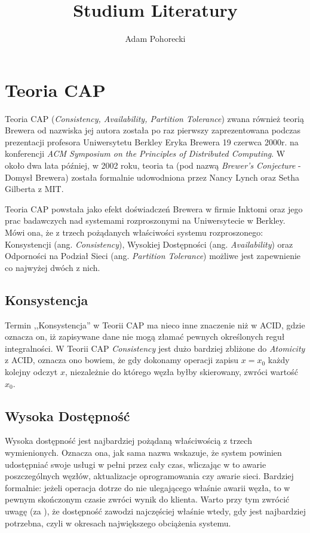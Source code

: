 \documentclass[a4paper,11pt]{article}
\title{Studium Literatury}
\author{Adam Pohorecki}
\begin{document}


\maketitle

\section{Teoria CAP}

Teoria CAP (\emph{Consistency, Availability, Partition Tolerance}) zwana
również teorią Brewera od nazwiska jej autora została po raz pierwszy
zaprezentowana podczas prezentacji profesora Uniwersytetu Berkley Eryka Brewera
19 czerwca 2000r. na konferencji \emph{ACM Symposium on the Principles of
Distributed Computing}\cite{podc-keynote}. W około dwa lata później, w 2002
roku, teoria ta (pod nazwą \emph{Brewer's Conjecture} - Domysł Brewera) została
formalnie udowodniona przez Nancy Lynch oraz Setha Gilberta z
MIT\cite{brewers-conjecture}.

Teoria CAP powstała jako efekt doświadczeń Brewera w firmie Inktomi oraz jego
prac badawczych nad systemami rozproszonymi na Uniwersytecie w Berkley. Mówi
ona, że z trzech pożądanych właściwości systemu rozproszonego: Konsystencji
(ang. \emph{Consistency}), Wysokiej Dostępności (ang. \emph{Availability}) oraz
Odporności na Podział Sieci (ang. \emph{Partition Tolerance}) możliwe jest
zapewnienie co najwyżej dwóch z nich.\cite{browne-cap-theorem}

\subsection*{Konsystencja}

Termin ,,Konsystencja'' w Teorii CAP ma nieco inne znaczenie niż w ACID, gdzie
oznacza on, iż zapisywane dane nie mogą złamać pewnych określonych reguł
integralności. W Teorii CAP \emph{Consistency} jest dużo bardziej zbliżone do
\emph{Atomicity} z ACID, oznacza ono bowiem, że gdy dokonamy operacji zapisu
$x=x_0$ każdy kolejny odczyt $x$, niezależnie do którego węzła byłby skierowany,
zwróci wartość $x_0$.

\subsection*{Wysoka Dostępność}

Wysoka dostępność jest najbardziej pożądaną właściwością z trzech wymienionych.
Oznacza ona, jak sama nazwa wskazuje, że system powinien udostępniać swoje
usługi w pełni przez cały czas, wliczając w to awarie poszczególnych węzłów,
aktualizacje oprogramowania czy awarie sieci. Bardziej formalnie: jeżeli
operacja dotrze do nie ulegającego właśnie awarii węzła, to w pewnym skończonym
czasie zwróci wynik do klienta. Warto przy tym zwrócić uwagę (za
\cite{brewers-conjecture}), że dostępność zawodzi najczęściej właśnie wtedy, gdy
jest najbardziej potrzebna, czyli w okresach największego obciążenia systemu.
\end{document}

